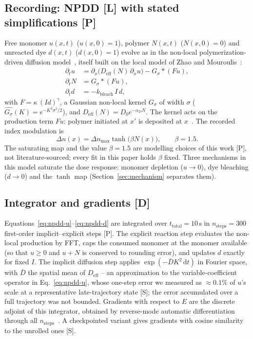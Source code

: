 \documentclass{optica-article}
\begin{document}
\subsection{Recording: NPDD [L] with stated simplifications [P]}
\label{sec:model-npdd}
Free monomer $u(x,t)$ ($u(x,0)=1$), polymer $N(x,t)$ ($N(x,0)=0$) and
unreacted dye $d(x,t)$ ($d(x,0)=1$) evolve as in the non-local
polymerization-driven diffusion model~\cite{sheridan2000nonlocal}, itself
built on the local model of Zhao and Mouroulis~\cite{zhao1994diffusion}:
\begin{align}
\partial_t u &= \partial_x\!\big(D_{\text{eff}}(N)\,\partial_x u\big) - G_\sigma*(F u), \label{eq:npdd-u}\\
\partial_t N &= G_\sigma*(F u), \label{eq:npdd-N}\\
\partial_t d &= -k_{\text{bleach}}\,I\,d, \label{eq:npdd-d}
\end{align}
with $F=\kappa\,(I d)^\gamma$, a Gaussian non-local kernel
$G_\sigma$ of width $\sigma$ ($\widehat{G_\sigma}(K)=e^{-K^2\sigma^2/2}$),
and $D_{\text{eff}}(N)=D_0e^{-\alpha_D N}$. The kernel acts on the production
term $Fu$: polymer initiated at $x'$ is deposited at $x$~\cite{sheridan2000nonlocal}.
The recorded index modulation is
\begin{equation}
\label{eq:npdd-dn}
\Delta n(x)=\Delta n_{\max}\tanh\!\big(\beta N(x)\big),\qquad \beta=1.5 .
\end{equation}
The saturating map and the value $\beta=1.5$ are modelling choices of this
work [P], not literature-sourced; every fit in this paper holds $\beta$
fixed. Three mechanisms in this model saturate the dose response: monomer
depletion ($u\to0$), dye bleaching ($d\to0$) and the $\tanh$ map
(Section~\ref{sec:mechanism} separates them).

\subsection{Integrator and gradients [D]}
\label{sec:model-imex}
Equations~\eqref{eq:npdd-u}--\eqref{eq:npdd-d} are integrated over
$t_{\text{total}}=10$\,s in $n_{\text{steps}}=300$ first-order
implicit--explicit steps [P]. The explicit reaction step evaluates the
non-local production by FFT, caps the consumed monomer at the monomer
available (so that $u\ge0$ and $u+N$ is conserved to rounding error), and
updates $d$ exactly for fixed $I$. The implicit diffusion step applies
$\exp(-\bar{D}K^2\,\mathrm{d}t)$ in Fourier space, with $\bar{D}$ the
spatial mean of $D_{\text{eff}}$ -- an approximation to the variable-coefficient
operator in Eq.~\eqref{eq:npdd-u}, whose one-step error we measured as
$\approx0.1\%$ of $u$'s scale at a representative late-trajectory state
[S]; the error accumulated over a full trajectory was not bounded.
Gradients with respect to $E$ are the discrete adjoint of this integrator,
obtained by reverse-mode automatic differentiation through all
$n_{\text{steps}}$~\cite{griewank2008evaluating,paszke2019pytorch}. A
checkpointed variant gives gradients with cosine similarity
\AblationCheckpointCosSim{} to the unrolled ones [S].
\end{document}
